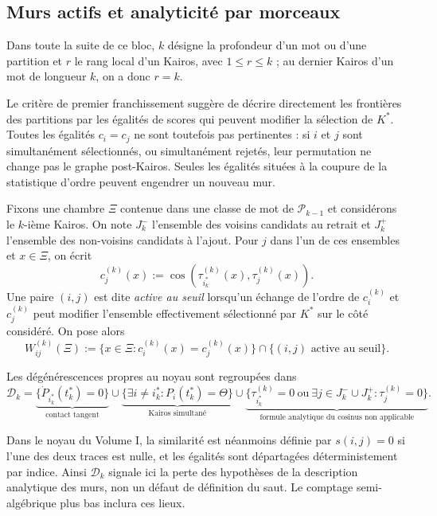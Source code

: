 \documentclass[11pt,a4paper]{article}
\theoremstyle{definition}
\theoremstyle{remark}
\begin{document}
\subsection{Murs actifs et analyticité par morceaux}

Dans toute la suite de ce bloc, $k$ désigne la profondeur d'un mot ou d'une partition et $r$ le rang local d'un Kairos, avec $1\le r\le k$ ; au dernier Kairos d'un mot de longueur $k$, on a donc $r=k$.

Le critère de premier franchissement suggère de décrire directement les frontières des partitions par les égalités de scores qui peuvent modifier la sélection de $K^*$. Toutes les égalités $c_i=c_j$ ne sont toutefois pas pertinentes : si $i$ et $j$ sont simultanément sélectionnés, ou simultanément rejetés, leur permutation ne change pas le graphe post-Kairos. Seules les égalités situées à la coupure de la statistique d'ordre peuvent engendrer un nouveau mur.

Fixons une chambre $\Xi$ contenue dans une classe de mot de $\mathcal P_{k-1}$ et considérons le $k$-ième Kairos. On note $J_k^-$ l'ensemble des voisins candidats au retrait et $J_k^+$ l'ensemble des non-voisins candidats à l'ajout. Pour $j$ dans l'un de ces ensembles et $x\in\Xi$, on écrit
\[
 c_j^{(k)}(x)
 :=\cos\!\left(\tau_{i_k^*}^{(k)}(x),\tau_j^{(k)}(x)\right).
\]
Une paire $(i,j)$ est dite \emph{active au seuil} lorsqu'un échange de l'ordre de $c_i^{(k)}$ et $c_j^{(k)}$ peut modifier l'ensemble effectivement sélectionné par $K^*$ sur le côté considéré. On pose alors
\[
 W_{ij}^{(k)}(\Xi)
 :=\{x\in\Xi:c_i^{(k)}(x)=c_j^{(k)}(x)\}
 \cap\{(i,j)\text{ active au seuil}\}.
\]

Les dégénérescences propres au noyau sont regroupées dans
\[
\mathcal D_k
=
\underbrace{\{\dot P_{i_k^*}(t_k^*)=0\}}_{\text{contact tangent}}
\cup
\underbrace{\{\exists i\neq i_k^*:P_i(t_k^*)=\Theta\}}_{\text{Kairos simultané}}
\cup
\underbrace{\{\tau_{i_k^*}^{(k)}=0\ \text{ou}\ \exists j\in J_k^-\cup J_k^+:\tau_j^{(k)}=0\}}_{\text{formule analytique du cosinus non applicable}}.
\]

Dans le noyau du Volume I, la similarité est néanmoins définie par $s(i,j)=0$ si l'une des deux traces est nulle, et les égalités sont départagées déterministement par indice. Ainsi $\mathcal D_k$ signale ici la perte des hypothèses de la description analytique des murs, non un défaut de définition du saut. Le comptage semi-algébrique plus bas inclura ces lieux.
\end{document}
